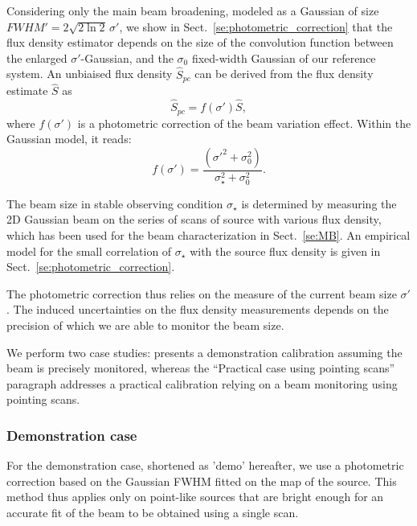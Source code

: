 Considering only the main beam broadening, modeled as a Gaussian of
size $FWHM' = 2 \sqrt{2\ln{2}} \, \sigma '$, we show in
Sect.~\ref{se:photometric_correction} that
the flux density estimator depends on the size of the convolution
function between the enlarged $\sigma '$-Gaussian, and the 
$\sigma_0$ fixed-width Gaussian of our reference system. An unbiaised
flux density $\hat{S}_{pc}$ can be derived from the flux density
estimate $\hat{S}$ as
\begin{equation}
  \hat{S}_{pc} = f(\sigma')\hat{S},
\end{equation}
where $f(\sigma')$ is a photometric correction of the beam variation
effect. Within the Gaussian model, it reads:
\begin{equation}
  f(\sigma') = \frac{(\sigma'^2 + \sigma_0^2)}{\sigma_{\star}^2 + \sigma_0^2}. 
\end{equation} 

The beam size in stable observing condition $\sigma_\star$ is
determined by measuring the 2D Gaussian beam on the series of scans of
source with various flux density, which has been used for the beam
characterization in Sect.~\ref{se:MB}.
An empirical model for the small correlation of
$\sigma_\star$ with the source flux density is given in
Sect.~\ref{se:photometric_correction}.

The photometric correction thus relies on the measure of the current beam
size $\sigma'$. The induced uncertainties on the flux density
measurements depends on the precision of which we are able to monitor
the beam size. 

We perform two case studies:  presents a demonstration
calibration assuming the beam is precisely monitored, whereas
the ``Practical case using pointing scans'' paragraph addresses a practical calibration relying
on a beam monitoring using pointing scans. 

\subsubsection{Demonstration case}
\label{se:photocorr_demo}

For the demonstration case, shortened as 'demo' hereafter, we use a
photometric correction based on the Gaussian FWHM fitted on the map
of the source. This method thus applies only on point-like
sources that are bright enough for an accurate fit of the beam to be
obtained using a single scan.  

